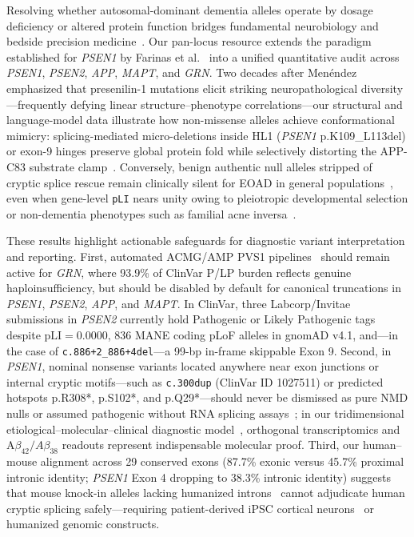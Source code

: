 \documentclass[11pt,a4paper]{article}
\begin{document}
Resolving whether autosomal-dominant dementia alleles operate by dosage deficiency or altered protein function bridges fundamental neurobiology and bedside precision medicine~\cite{menendez2004,menendezgonzalez2025,farinas2026}. Our pan-locus resource extends the paradigm established for \textit{PSEN1} by Farinas et al.~\cite{farinas2026} into a unified quantitative audit across \textit{PSEN1}, \textit{PSEN2}, \textit{APP}, \textit{MAPT}, and \textit{GRN}. Two decades after Men{\'e}ndez~\cite{menendez2004} emphasized that presenilin-1 mutations elicit striking neuropathological diversity—frequently defying linear structure--phenotype correlations—our structural and language-model data illustrate how non-missense alleles achieve conformational mimicry: splicing-mediated micro-deletions inside HL1 (\textit{PSEN1} p.K109\_L113del) or exon-9 hinges preserve global protein fold while selectively distorting the APP-C83 substrate clamp~\cite{zhou2019,yang2019}. Conversely, benign authentic null alleles stripped of cryptic splice rescue remain clinically silent for EOAD in general populations~\cite{farinas2026}, even when gene-level \texttt{pLI} nears unity owing to pleiotropic developmental selection or non-dementia phenotypes such as familial acne inversa~\cite{wang2010}.

These results highlight actionable safeguards for diagnostic variant interpretation and reporting. First, automated ACMG/AMP PVS1 pipelines~\cite{richards2015,aboutayoun2018} should remain active for \textit{GRN}, where 93.9\% of ClinVar P/LP burden reflects genuine haploinsufficiency, but should be disabled by default for canonical truncations in \textit{PSEN1}, \textit{PSEN2}, \textit{APP}, and \textit{MAPT}. In ClinVar, three Labcorp/Invitae submissions in \textit{PSEN2} currently hold Pathogenic or Likely Pathogenic tags despite $\mathrm{pLI}=0.0000$, 836 MANE coding pLoF alleles in gnomAD v4.1, and—in the case of \texttt{c.886+2\_886+4del}—a 99-bp in-frame skippable Exon 9. Second, in \textit{PSEN1}, nominal nonsense variants located anywhere near exon junctions or internal cryptic motifs—such as \texttt{c.300dup} (ClinVar ID 1027511) or predicted hotspots p.R308*, p.S102*, and p.Q29*—should never be dismissed as pure NMD nulls or assumed pathogenic without RNA splicing assays~\cite{baralle2005,dejonghe1999}; in our tridimensional etiological--molecular--clinical diagnostic model~\cite{menendezgonzalez2025}, orthogonal transcriptomics and A$\beta_{42}/A\beta_{38}$ readouts represent indispensable molecular proof. Third, our human--mouse alignment across 29 conserved exons (87.7\% exonic versus 45.7\% proximal intronic identity; \textit{PSEN1} Exon 4 dropping to 38.3\% intronic identity) suggests that mouse knock-in alleles lacking humanized introns~\cite{sanjuanruiz2025} cannot adjudicate human cryptic splicing safely—requiring patient-derived iPSC cortical neurons~\cite{arber2019} or humanized genomic constructs.
\end{document}
